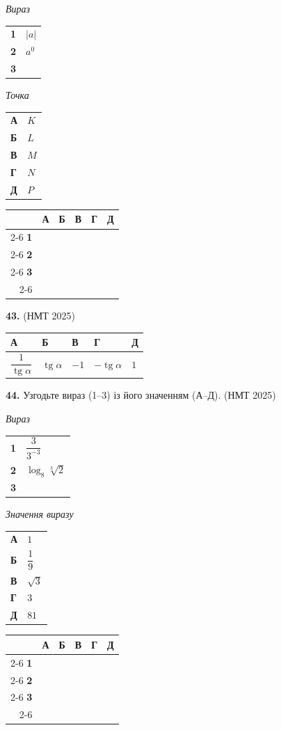 \documentclass[14pt]{extarticle}
\newcommand{\answerTableTall}[5]{
\begin{center}
\begin{tabular}{|*{5}{>{\centering\arraybackslash}m{2.8cm}|}}
\hline
\rule[-0.3cm]{0pt}{0.8cm}\textbf{А} & \textbf{Б} & \textbf{В} & \textbf{Г} & \textbf{Д} \\
\hline
\rule[-0.9cm]{0pt}{2.0cm}#1 & 
\rule[-0.9cm]{0pt}{2.0cm}#2 & 
\rule[-0.9cm]{0pt}{2.0cm}#3 & 
\rule[-0.9cm]{0pt}{2.0cm}#4 & 
\rule[-0.9cm]{0pt}{2.0cm}#5 \\
\hline
\end{tabular}
\end{center}
}
\newcommand{\answerGrid}{
    \begingroup
    \renewcommand{\arraystretch}{1.3} 
    \setlength{\tabcolsep}{7pt} 
    \begin{tabular}{r|c|c|c|c|c|}
         \multicolumn{1}{c}{} & \multicolumn{1}{c}{\textbf{А}} & \multicolumn{1}{c}{\textbf{Б}} & \multicolumn{1}{c}{\textbf{В}} & \multicolumn{1}{c}{\textbf{Г}} & \multicolumn{1}{c}{\textbf{Д}} \\ \cline{2-6}
         \textbf{1} & & & & & \\ \cline{2-6}
         \textbf{2} & & & & & \\ \cline{2-6}
         \textbf{3} & & & & & \\ \cline{2-6}
    \end{tabular}
    \endgroup
}
\newcommand{\matchingLayout}[3]{
    \noindent
    \begin{minipage}[t]{0.40\textwidth}
       
        #1
    \end{minipage}%
    \hfill
    \begin{minipage}[t]{0.28\textwidth}
        
        #2
    \end{minipage}%
    \hfill
    \begin{minipage}[t]{0.30\textwidth}
        \vspace{0pt} %
        \begin{flushright}
        #3
        \end{flushright}
    \end{minipage}
}
\newcommand{\nmtyear}[1]{\hfill{\small\color{yearcolor}(НМТ #1)}}
\begin{document}
\matchingLayout{
    \textit{Вираз} \par \vspace{0.2cm}
    \begin{tabular}{@{}p{0.5cm} l@{}}
    \textbf{1} & $|a|$ \\[0.4cm]
    \textbf{2} & $a^0$ \\[0.4cm]
    \textbf{3} & \trigStyle{$\operatorname{tg}(\pi a)$} \\
    \end{tabular}
}{
    \textit{Точка} \par \vspace{0.2cm}
    \begin{tabular}{@{}p{0.5cm} l@{}}
    \textbf{А} & $K$ \\[0.2cm]
    \textbf{Б} & $L$ \\[0.2cm]
    \textbf{В} & $M$ \\[0.2cm]
    \textbf{Г} & $N$ \\[0.2cm]
    \textbf{Д} & $P$ \\
    \end{tabular}
}{
    \answerGrid
}

\vspace{0.7cm}

\noindent\textbf{43.}  \nmtyear{2025}

\vspace{0.3cm}
\answerTableTall{$\dfrac{1}{\operatorname{tg} \alpha}$}{$\operatorname{tg} \alpha$}{$-1$}{$-\operatorname{tg} \alpha$}{$1$}

\vspace{0.7cm}

\noindent\textbf{44.} Узгодьте вираз (1--3) із його значенням (А--Д). \nmtyear{2025}

\vspace{0.3cm}

\matchingLayout{
    \textit{Вираз} \par \vspace{0.2cm}
    \begin{tabular}{@{}p{0.5cm} l@{}}
    \textbf{1} & $\dfrac{3}{3^{-3}}$ \\[0.6cm]
    \textbf{2} & $\log_8 \sqrt[3]{2}$ \\[0.6cm]
    \textbf{3} & \trigStyle{$2(\cos 30^\circ - 0{,}5)(\cos 30^\circ + 0{,}5)$} \\
    \end{tabular}
}{
    \textit{Значення виразу} \par \vspace{0.2cm}
    \begin{tabular}{@{}p{0.5cm} l@{}}
    \textbf{А} & $1$ \\[0.2cm]
    \textbf{Б} & $\dfrac{1}{9}$ \\[0.4cm]
    \textbf{В} & $\sqrt{3}$ \\[0.2cm]
    \textbf{Г} & $3$ \\[0.2cm]
    \textbf{Д} & $81$ \\
    \end{tabular}
}{
    \answerGrid
}
\end{document}
